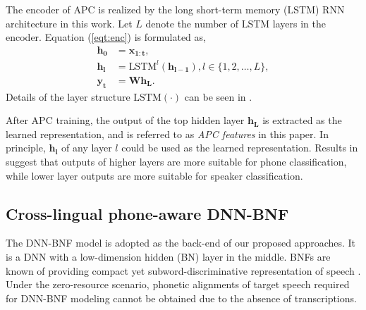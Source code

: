 \documentclass[a4paper]{article}
\begin{document}
The encoder of APC is realized by the long short-term memory (LSTM) \cite{hochreiter1997long} RNN architecture in this work. Let $L$ denote the number of LSTM layers in the encoder. Equation (\ref{eqt:enc}) is formulated as,
\begin{align}
    \bm{h_0} &= \bm{x_{1:t}},    \\
    \bm{h_l} &= \textrm{LSTM}^l (\bm{h_{l-1}}), l\in \{1,2,\ldots, L\}, \\
    \bm{y_t} &= \bm{W} \bm{h_L}.
\end{align}
Details of the  layer structure $\textrm{LSTM} (\cdot)$ can be seen in \cite{sak2014long}.

After APC training, the output of the top hidden layer $\bm{h_L}$ is extracted as the  learned  representation, and is referred to as \textit{APC features} in this paper. In principle,  $\bm{h_l}$ of any layer $l$ could be used as the learned representation. Results in \cite{Chung2019} suggest that outputs of higher layers  are more suitable for phone classification, while lower layer outputs are  more suitable for speaker classification.

\subsection{Cross-lingual phone-aware DNN-BNF}
The DNN-BNF model  \cite{chen2017multilingual,feng2018exploiting} is adopted as the back-end of our proposed approaches. It is a DNN with a low-dimension hidden (BN) layer in the middle. BNFs are known of providing compact yet subword-discriminative representation of speech \cite{grezl2009investigation}.  
Under the zero-resource scenario, phonetic alignments of target speech required for DNN-BNF modeling cannot be obtained due to the absence of transcriptions. 
\end{document}
